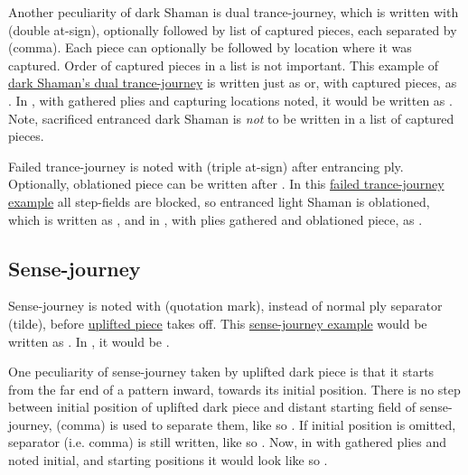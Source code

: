 Another peculiarity of dark Shaman is dual trance-journey, which is written with 
(double at-sign), optionally followed by list of captured pieces, each separated by \alg{,}
(comma). Each piece can optionally be followed by location where it was captured. Order of
captured pieces in a list is not important. This example of
\hyperref[fig:scn_cot_092_dark_dark_shaman_double_interaction_start]{dark Shaman's dual trance-journey}
is written just as  or, with captured pieces, as
. In , with gathered plies and capturing locations noted,
it would be written as \newline
{} \newline
{}. \newline
Note, sacrificed entranced dark Shaman is \emph{not} to be written in a list of captured
pieces.

Failed trance-journey is noted with  (triple at-sign) after entrancing ply.
Optionally, oblationed piece can be written after . In this
\hyperref[fig:scn_o_37_trance_journey_failed]{failed trance-journey example} all
step-fields are blocked, so entranced light Shaman is oblationed, which is written as
, and in , with plies gathered and oblationed piece, as
.

\subsection*{Sense-journey}
\label{sec:Appendix/Notation/Sense-journey}

Sense-journey is noted with  (quotation mark), instead of normal ply separator
\alg{\~{}} (tilde), before \hyperref[fig:scn_o_42_uplifting_step]{uplifted piece} takes
off. This \hyperref[fig:scn_o_45_dark_piece_sense_journey]{sense-journey example} would
be written as . In , it would be
.

One peculiarity of sense-journey taken by uplifted dark piece is that it starts from
the far end of a pattern inward, towards its initial position. There is no step between
initial position of uplifted dark piece and distant starting field of sense-journey,
\alg{,} (comma) is used to separate them, like so
.
If initial position is omitted, separator (i.e. comma) is still written, like so
. Now, in  with gathered plies
and noted initial, and starting positions it would look like so \newline
{} \newline
\alg{[Bc5,z11-n7]}.

